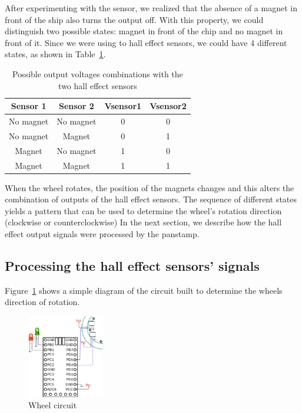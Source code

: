  After experimenting with the sensor, we realized that the absence of a magnet in front of the ship also turns the output off. With this property, we could distinguish two possible states:  magnet in front of the chip and no magnet in front of it. Since we were using to hall effect sensors, we could have 4 different states, as shown in Table~\ref{hall-sensor-output}. 
 
 
\begin{table}[h]
  \centering
  \begin{tabular}{ c | c | c | c}
    \hline
    \textbf{Sensor 1} & \textbf{Sensor 2} & \textbf{Vsensor1 } & \textbf{Vsensor2}\\ [0.5ex]    
    \hline
    No magnet & No magnet & 0 & 0 \\
    No magnet & Magnet & 0 & 1\\
    Magnet & No magnet & 1 & 0\\
    Magnet & Magnet & 1 & 1 \\      
    \hline
  \end{tabular}
  \caption[Output voltages in hall effect sensors]%
          {Possible output voltages combinations with the two hall effect sensors}
  \label{hall-sensor-output}
\end{table}

When the wheel rotates, the position of the magnets changes and this alters the combination of outputs of the hall effect sensors. The sequence of different states yields a pattern that can be used to determine the wheel's rotation direction (clockwise or counterclockwise)  In the next section, we describe how the hall effect output signals were processed by the panstamp.

\subsection{Processing the hall effect sensors' signals}

Figure~\ref{fig:Wheel-circuit} shows a simple diagram of the circuit built to determine the wheels direction of rotation. 

\begin{figure}[h!]
 \centering
 \includegraphics[width= 0.3\textwidth, clip=true  ,keepaspectratio=true]{./graph/wheel-circuit.png}
 \caption{Wheel circuit}
 \label{fig:Wheel-circuit}
\end{figure}

